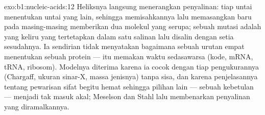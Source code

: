 \begin{solution}{exo:b1:nucleic-acids:12}
Heliksnya langsung menerangkan penyalinan: tiap untai menentukan untai
yang lain, sehingga memisahkannya lalu memasangkan  baru pada
masing-masing memberikan dua molekul yang serupa; sebuah mutasi adalah
 yang keliru yang tertetapkan dalam satu salinan lalu disalin
dengan setia sesudahnya. Ia sendirian tidak menyatakan bagaimana sebuah
urutan empat  menentukan sebuah protein --- itu memakan waktu
sedasawarsa (kode, mRNA, tRNA, ribosom). Modelnya diterima karena ia
cocok dengan tiap pengukurannya (Chargaff, ukuran sinar-X, massa
jenisnya) tanpa sisa, dan karena penjelasannya tentang pewarisan sifat
begitu hemat sehingga pilihan lain --- sebuah kebetulan --- menjadi tak
masuk akal; Meselson dan Stahl lalu membenarkan penyalinan yang
diramalkannya.
\end{solution}

